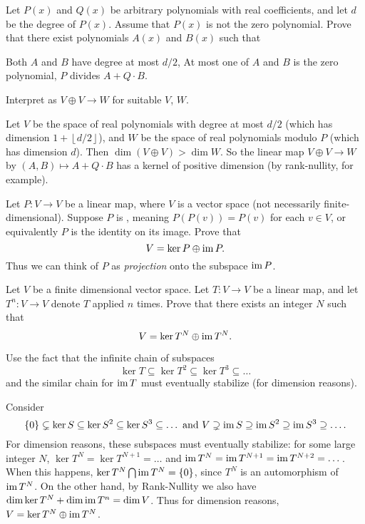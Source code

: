 \begin{problem}[TSTST 2014]
	\gim
	Let $P(x)$ and $Q(x)$ be arbitrary polynomials with real coefficients,
	and let $d$ be the degree of $P(x)$.
	Assume that $P(x)$ is not the zero polynomial.
	Prove that there exist polynomials $A(x)$ and $B(x)$ such that
	\begin{enumerate}[(i)]
		\ii Both $A$ and $B$ have degree at most $d/2$,
		\ii At most one of $A$ and $B$ is the zero polynomial,
		\ii $P$ divides $A+Q \cdot B$.
	\end{enumerate}
	\begin{hint}
		Interpret as $V \oplus V \to W$ for suitable $V$, $W$.
	\end{hint}
	\begin{sol}
		Let $V$ be the space of real polynomials with degree at most $d/2$
		(which has dimension $1 + \left\lfloor d/2 \right\rfloor$),
		and $W$ be the space of real polynomials modulo $P$ (which has dimension $d$).
		Then $\dim (V \oplus V) > \dim W$.
		So the linear map $V \oplus V \to W$ by $(A,B) \mapsto A + Q \cdot B$
		has a kernel of positive dimension
		(by rank-nullity, for example).
	\end{sol}
\end{problem}

\begin{sproblem}
	\label{prob:idempotent}
	Let $P \colon V \to V$ be a linear map,
	where $V$ is a vector space
	(not necessarily finite-dimensional).
	Suppose $P$ is ,
	meaning $P(P(v)) = P(v)$ for each $v \in V$,
	or equivalently $P$ is the identity on its image.
	Prove that \[ V = \ker P \oplus \operatorname{im} P. \]
	Thus we can think of $P$ as \emph{projection}
	onto the subspace $\operatorname{im} P$.
\end{sproblem}

\begin{sproblem}
	\label{prob:endomorphism_eventual_lemma}
	\gim
	Let $V$ be a finite dimensional vector space.
	Let $T \colon V \to V$ be a linear map,
	and let $T^n \colon V \to V$ denote $T$ applied $n$ times.
	Prove that there exists an integer $N$ such that
	\[ V = \ker T^N \oplus \operatorname{im} T^N. \]
	\begin{hint}
		Use the fact that the infinite chain of subspaces
		\[ \ker T \subseteq \ker T^2 \subseteq \ker T^3 \subseteq \dots \]
		and the similar chain for $\operatorname{im} T$ must eventually stabilize
		(for dimension reasons).
	\end{hint}
	\begin{sol}
		Consider
		\[
			\{0\} \subsetneq \ker S \subseteq \ker S^2 \subseteq \ker S^3 \subseteq \dots
			\text{  and  }
			V \supsetneq \operatorname{im} S \supseteq \operatorname{im} S^2 \supseteq \operatorname{im} S^3 \supseteq \dots.
		\]
		For dimension reasons, these subspaces must eventually stabilize:
		for some large integer $N$,
		$\ker T^N = \ker T^{N+1} = \dots$
		and $\operatorname{im} T^N = \operatorname{im} T^{N+1} = \operatorname{im} T^{N+2} = \dots$.
		When this happens, $\ker T^N \bigcap \operatorname{im} T^N = \{0\}$,
		since $T^N$ is an automorphism of $\operatorname{im} T^N$.
		On the other hand, by Rank-Nullity we also have
		$\dim \ker T^N + \dim \operatorname{im} T^n = \dim V$.
		Thus for dimension reasons, $V = \ker T^N \oplus \operatorname{im} T^N$.
	\end{sol}
\end{sproblem}


